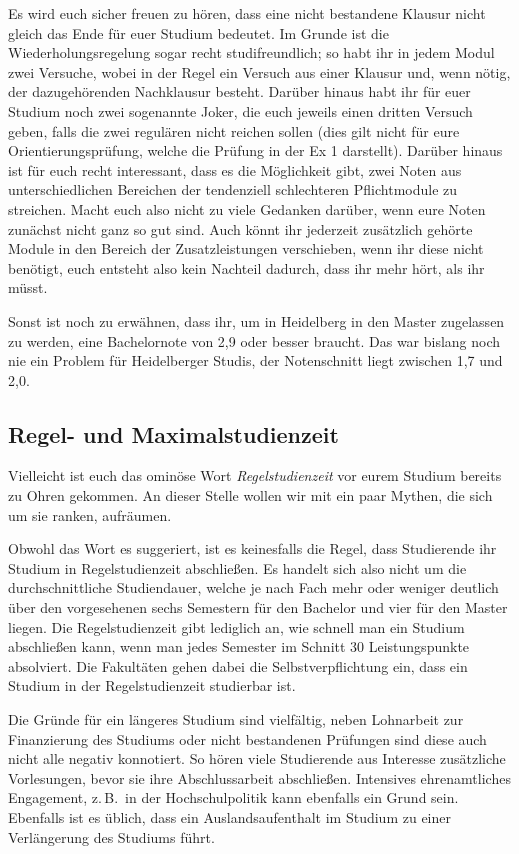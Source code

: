 Es wird euch sicher freuen zu hören, dass eine nicht bestandene Klausur nicht gleich das Ende für euer Studium bedeutet. Im Grunde ist die Wiederholungsregelung sogar recht studifreundlich; so habt ihr in jedem Modul zwei Versuche, wobei in der Regel ein Versuch aus einer Klausur und, wenn nötig, der dazugehörenden Nachklausur besteht. Darüber hinaus habt ihr für euer Studium noch zwei sogenannte Joker, die euch jeweils einen dritten Versuch geben, falls die zwei regulären nicht reichen sollen (dies gilt nicht für eure Orientierungsprüfung, welche die Prüfung in der \gls{Ex} 1 darstellt). Darüber hinaus ist für euch recht interessant, dass es die Möglichkeit gibt, zwei Noten aus unterschiedlichen Bereichen der tendenziell schlechteren Pflichtmodule zu streichen. Macht euch also nicht zu viele Gedanken darüber, wenn eure Noten zunächst nicht ganz so gut sind. Auch könnt ihr jederzeit zusätzlich gehörte Module in den Bereich der Zusatzleistungen verschieben, wenn ihr diese nicht benötigt, euch entsteht also kein Nachteil dadurch, dass ihr mehr hört, als ihr müsst.

Sonst ist noch zu erwähnen, dass ihr, um in Heidelberg in den Master zugelassen zu werden, eine Bachelornote von 2,9 oder besser braucht. Das war bislang noch nie ein Problem für Heidelberger Studis, der Notenschnitt liegt zwischen 1,7 und 2,0.

\subsection{Regel- und Maximalstudienzeit}

Vielleicht ist euch das ominöse Wort \emph{Regelstudienzeit} vor eurem Studium bereits zu Ohren gekommen. An dieser Stelle wollen wir mit ein paar Mythen, die sich um sie ranken, aufräumen.

Obwohl das Wort es suggeriert, ist es keinesfalls die Regel, dass Studierende ihr Studium in Regelstudienzeit abschließen. Es handelt sich also nicht um die durchschnittliche Studiendauer, welche je nach Fach mehr oder weniger deutlich über den vorgesehenen sechs Semestern für den Bachelor und vier für den Master liegen. Die Regelstudienzeit gibt lediglich an, wie schnell man ein Studium abschließen kann, wenn man jedes Semester im Schnitt 30 Leistungspunkte absolviert. Die Fakultäten gehen dabei die Selbstverpflichtung ein, dass ein Studium in der Regelstudienzeit studierbar ist.

Die Gründe für ein längeres Studium sind vielfältig, neben Lohnarbeit zur Finanzierung des Studiums oder nicht bestandenen Prüfungen sind diese auch nicht alle negativ konnotiert. So hören viele Studierende aus Interesse zusätzliche Vorlesungen, bevor sie ihre Abschlussarbeit abschließen. Intensives ehrenamtliches Engagement, z.\,B.~in der Hochschulpolitik kann ebenfalls ein Grund sein. Ebenfalls ist es üblich, dass ein Auslandsaufenthalt im Studium zu einer Verlängerung des Studiums führt.

